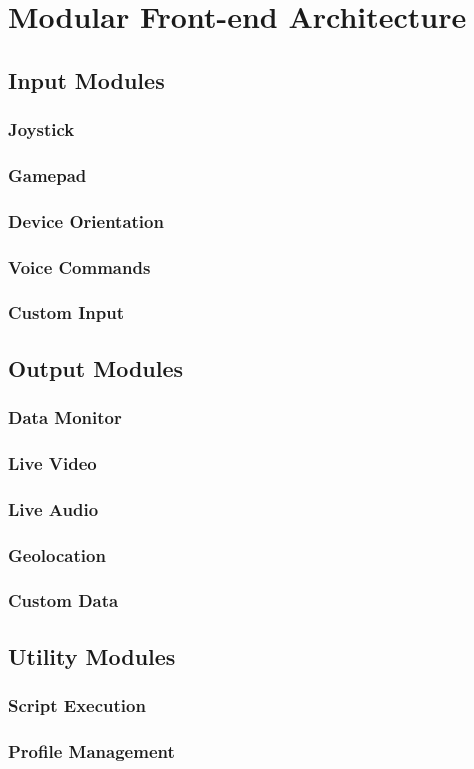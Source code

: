 \section{Modular Front-end Architecture} \label{modularfrontendarchitecture}
\subsection{Input Modules}
\subsubsection{Joystick} \label{joystick}
\subsubsection{Gamepad} \label{gamepad}
\subsubsection{Device Orientation} \label{deviceorientation}
\subsubsection{Voice Commands} \label{voicecommands}
\subsubsection{Custom Input} \label{custominput}
\subsection{Output Modules}
\subsubsection{Data Monitor} \label{datamonitor}
\subsubsection{Live Video} \label{livevideo}
\subsubsection{Live Audio} \label{liveaudio}
\subsubsection{Geolocation}
\subsubsection{Custom Data} \label{customdata}
\subsection{Utility Modules}
\subsubsection{Script Execution} \label{scriptexecution}
\subsubsection{Profile Management} \label{profilemanagement}
